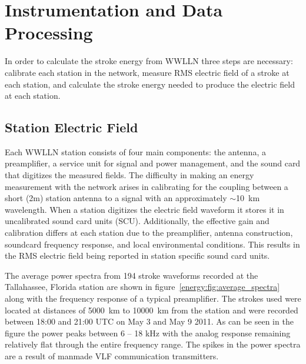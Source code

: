 \section{Instrumentation and Data Processing}

In order to calculate the stroke energy from WWLLN three steps are necessary: calibrate each station in the network, measure RMS electric field of a stroke at each station, and calculate the stroke energy needed to produce the electric field at each station.

\subsection{Station Electric Field}

Each WWLLN station consists of four main components: the antenna, a preamplifier, a service unit for signal and power management, and the sound card that digitizes the measured fields.
The difficulty in making an energy measurement with the network arises in calibrating for the coupling between a short (2m) station antenna to a signal with an approximately $\sim$10~km wavelength.
When a station digitizes the electric field waveform it stores it in uncalibrated sound card units (SCU).
Additionally, the effective gain and calibration differs at each station due to the preamplifier, antenna construction, soundcard frequency response, and local environmental conditions.
This results in the RMS electric field being reported in station specific sound card units.

The average power spectra from 194 stroke waveforms recorded at the Tallahassee, Florida station are shown in figure~\ref{energy:fig:average_spectra} along with the frequency response of a typical preamplifier.
The strokes used were located at distances of 5000~km to 10000~km from the station and were recorded between 18:00 and 21:00 UTC on May 3 and May 9 2011.
As can be seen in the figure the power peaks between 6 -- 18 kHz with the analog response remaining relatively flat through the entire frequency range.
The spikes in the power spectra are a result of manmade VLF communication transmitters.

